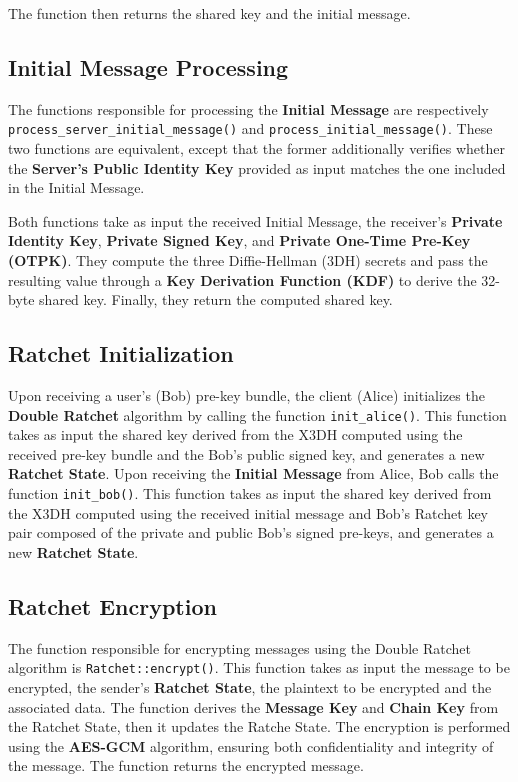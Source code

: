 The function then returns the shared key and the initial message.

\subsection{Initial Message Processing}
\label{subsec:InitialMessageProcessing}

The functions responsible for processing the \textbf{Initial Message} are respectively \\ \texttt{process\_server\_initial\_message()} and \texttt{process\_initial\_message()}. These two functions are equivalent, except that the former additionally verifies whether the \textbf{Server's Public Identity Key} provided as input matches the one included in the Initial Message.  

Both functions take as input the received Initial Message, the receiver's \textbf{Private Identity Key}, \textbf{Private Signed Key}, and \textbf{Private One-Time Pre-Key (OTPK)}. They compute the three Diffie-Hellman (3DH) secrets and pass the resulting value through a \textbf{Key Derivation Function (KDF)} to derive the 32-byte shared key. Finally, they return the computed shared key.  

\subsection{Ratchet Initialization}
\label{subsec:RatchetInitialization}
Upon receiving a user's (Bob) pre-key bundle, the client (Alice) initializes the \textbf{Double Ratchet} algorithm by calling the function \texttt{init\_alice()}. This function takes as input the shared key derived from the X3DH computed using the received pre-key bundle and the Bob's public signed key, and generates a new \textbf{Ratchet State}.
Upon receiving the \textbf{Initial Message} from Alice, Bob calls the function \texttt{init\_bob()}. This function takes as input the shared key derived from the X3DH computed using the received initial message and Bob's Ratchet key pair composed of the private and public Bob's signed pre-keys, and generates a new \textbf{Ratchet State}.

\subsection{Ratchet Encryption}
\label{subsec:RatchetEncryption}
The function responsible for encrypting messages using the Double Ratchet algorithm is \texttt{Ratchet::encrypt()}. This function takes as input the message to be encrypted, the sender's \textbf{Ratchet State}, the plaintext to be encrypted and the associated data.
The function derives the \textbf{Message Key} and \textbf{Chain Key} from the Ratchet State, then it updates the Ratche State. The encryption is performed using the \textbf{AES-GCM} algorithm, ensuring both confidentiality and integrity of the message. The function returns the encrypted message.

